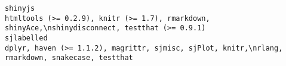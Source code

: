 \documentclass[
  letterpaper,
  DIV=11,
  numbers=noendperiod]{scrreprt}
\begin{document}
\begin{verbatim}
shinyjs                                                                                                                                                                                                                                                                                                                                                                                                                                                                                                                                                                                                                                                                                                                                                                                                                                                                                                                                                                                                                                                                                                                                                                                                      htmltools (>= 0.2.9), knitr (>= 1.7), rmarkdown, shinyAce,\nshinydisconnect, testthat (>= 0.9.1)
sjlabelled                                                                                                                                                                                                                                                                                                                                                                                                                                                                                                                                                                                                                                                                                                                                                                                                                                                                                                                                                                                                                                                                                                                                                                                                   dplyr, haven (>= 1.1.2), magrittr, sjmisc, sjPlot, knitr,\nrlang, rmarkdown, snakecase, testthat

\end{verbatim}
\end{document}
